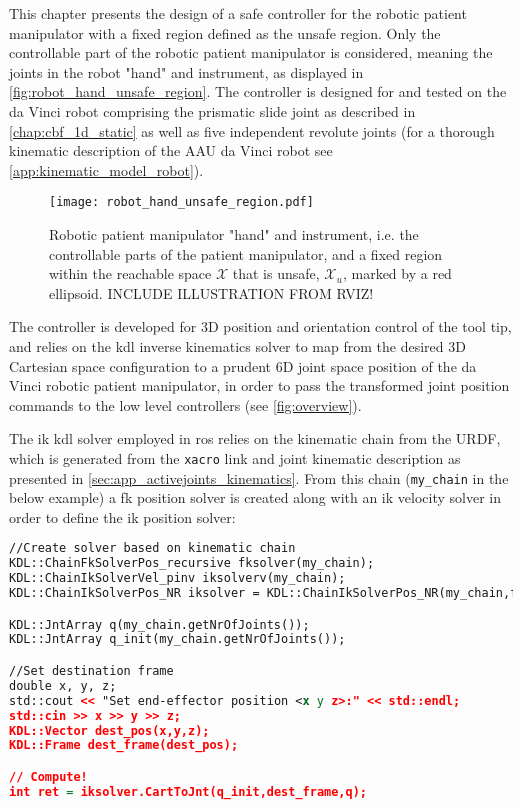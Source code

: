 This chapter presents the design of a safe controller for the  robotic patient manipulator with a fixed region defined as the unsafe region. Only the controllable part of the robotic patient manipulator is considered, meaning the joints in the robot "hand" and instrument, as displayed in \autoref{fig:robot_hand_unsafe_region}. The controller is designed for and tested on the da Vinci robot comprising the prismatic slide joint as described in \autoref{chap:cbf_1d_static} as well as five independent revolute joints (for a thorough kinematic description of the AAU da Vinci robot see \autoref{app:kinematic_model_robot}).

\begin{figure}[htbp]
\centering
\texttt{[image: robot\_hand\_unsafe\_region.pdf]}
\caption{Robotic patient manipulator "hand" and instrument, i.e. the controllable parts of the patient manipulator, and a fixed region within the reachable space $\mathcal{X}$ that is unsafe, $\mathcal{X}_u$, marked by a red ellipsoid. INCLUDE ILLUSTRATION FROM RVIZ!}
\label{fig:robot_hand_unsafe_region}
\end{figure}

The controller is developed for 3D position and orientation control of the tool tip, and relies on the \gls{kdl} inverse kinematics solver to map from the desired 3D Cartesian space configuration to a prudent 6D joint space position of the da Vinci robotic patient manipulator, in order to pass the transformed joint position commands to the low level controllers (see \autoref{fig:overview}).

The \gls{ik} \gls{kdl} solver employed in \gls{ros} relies on the kinematic chain from the URDF, which is generated from the \texttt{xacro} link and joint kinematic description as presented in %
\autoref{sec:app_activejoints_kinematics}. From this chain (\texttt{my\_chain} in the below example) a \gls{fk} position solver is created along with an \gls{ik} velocity solver in order to define the \gls{ik} position solver:

\begin{lstlisting}[language=xml]
//Create solver based on kinematic chain
KDL::ChainFkSolverPos_recursive fksolver(my_chain);
KDL::ChainIkSolverVel_pinv iksolverv(my_chain);
KDL::ChainIkSolverPos_NR iksolver = KDL::ChainIkSolverPos_NR(my_chain,fksolver,iksolverv,100,1e-6);

KDL::JntArray q(my_chain.getNrOfJoints());
KDL::JntArray q_init(my_chain.getNrOfJoints());

//Set destination frame
double x, y, z;
std::cout << "Set end-effector position <x y z>:" << std::endl;
std::cin >> x >> y >> z;
KDL::Vector dest_pos(x,y,z);
KDL::Frame dest_frame(dest_pos);

// Compute!
int ret = iksolver.CartToJnt(q_init,dest_frame,q);
\end{lstlisting}

